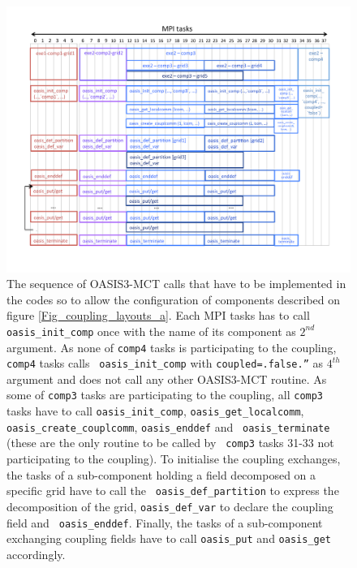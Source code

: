 \begin{figure}
  \includegraphics[scale=.6]{figures/coupling_layouts_b}
  \caption{The sequence of OASIS3-MCT calls that have to be implemented in the codes so to allow the configuration of components described on figure \ref{Fig_coupling_layouts_a}.
Each MPI tasks has to call {\tt oasis\_init\_comp} once with the name
of its component as $2^{nd}$ argument. As none of {\tt comp4} tasks is
participating to the coupling, {\tt comp4} tasks calls {\tt
  oasis\_init\_comp} with {\tt coupled=.false.”} as $4^{th}$ argument
and does not call any other OASIS3-MCT routine. As some of {\tt comp3}
tasks are participating to the coupling, all {\tt comp3} tasks have to
call {\tt oasis\_init\_comp}, {\tt oasis\_get\_localcomm}, {\tt
  oasis\_create\_couplcomm}, {\tt oasis\_enddef} and {\tt
  oasis\_terminate} (these are the only routine to be called by {\tt
  comp3} tasks 31-33 not participating to the coupling). To initialise
the coupling exchanges, the tasks of a sub-component holding a field
decomposed on a specific grid have to call the {\tt
  oasis\_def\_partition} to express the decomposition of the grid,
{\tt oasis\_def\_var} to declare the coupling field and {\tt
  oasis\_enddef}. Finally, the tasks of a sub-component exchanging 
coupling fields have to call {\tt oasis\_put} and {\tt oasis\_get} accordingly.
}
  \label{Fig_coupling_layouts_b}
\end{figure}


